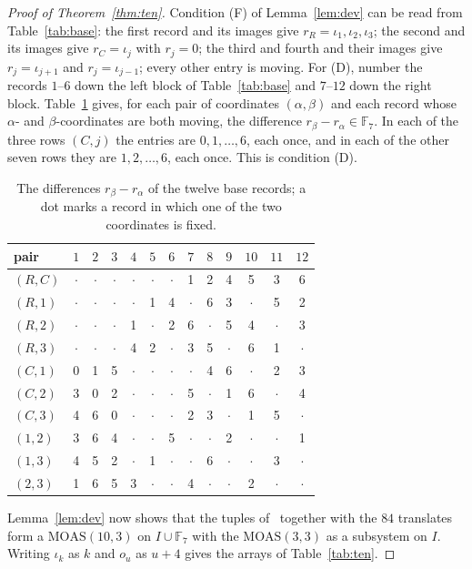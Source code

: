 \documentclass[11pt]{amsart}
\theoremstyle{definition}\newtheorem{definition}[theorem]{Definition}
\theoremstyle{remark}\newtheorem{remark}[theorem]{Remark}
\newcommand{\MOAS}{\mathrm{MOAS}}
\begin{document}
\begin{proof}[Proof of Theorem~\ref{thm:ten}]
Condition (F) of Lemma~\ref{lem:dev} can be read from Table~\ref{tab:base}: the first record and its images give
$r_R=\iota_1,\iota_2,\iota_3$; the second and its images give $r_C=\iota_j$ with $r_j=0$; the third and fourth and
their images give $r_j=\iota_{j+1}$ and $r_j=\iota_{j-1}$; every other entry is moving. For (D), number the records
$1$--$6$ down the left block of Table~\ref{tab:base} and $7$--$12$ down the right block. Table~\ref{tab:diff} gives, for
each pair of coordinates $(\alpha,\beta)$ and each record whose $\alpha$- and $\beta$-coordinates are both moving, the
difference $r_\beta-r_\alpha\in\mathbb F_7$. In each of the three rows $(C,j)$ the entries are $0,1,\dots,6$, each once,
and in each of the other seven rows they are $1,2,\dots,6$, each once. This is condition (D).

\begin{table}[ht]
\centering\small
\begin{tabular}{lcccccccccccc}
\toprule
pair & $1$ & $2$ & $3$ & $4$ & $5$ & $6$ & $7$ & $8$ & $9$ & $10$ & $11$ & $12$\\
\midrule
$(R,C)$ & $\cdot$ & $\cdot$ & $\cdot$ & $\cdot$ & $\cdot$ & $\cdot$ & 1 & 2 & 4 & 5 & 3 & 6 \\
$(R,1)$ & $\cdot$ & $\cdot$ & $\cdot$ & $\cdot$ & 1 & 4 & $\cdot$ & 6 & 3 & $\cdot$ & 5 & 2 \\
$(R,2)$ & $\cdot$ & $\cdot$ & $\cdot$ & 1 & $\cdot$ & 2 & 6 & $\cdot$ & 5 & 4 & $\cdot$ & 3 \\
$(R,3)$ & $\cdot$ & $\cdot$ & $\cdot$ & 4 & 2 & $\cdot$ & 3 & 5 & $\cdot$ & 6 & 1 & $\cdot$ \\
$(C,1)$ & 0 & 1 & 5 & $\cdot$ & $\cdot$ & $\cdot$ & $\cdot$ & 4 & 6 & $\cdot$ & 2 & 3 \\
$(C,2)$ & 3 & 0 & 2 & $\cdot$ & $\cdot$ & $\cdot$ & 5 & $\cdot$ & 1 & 6 & $\cdot$ & 4 \\
$(C,3)$ & 4 & 6 & 0 & $\cdot$ & $\cdot$ & $\cdot$ & 2 & 3 & $\cdot$ & 1 & 5 & $\cdot$ \\
$(1,2)$ & 3 & 6 & 4 & $\cdot$ & $\cdot$ & 5 & $\cdot$ & $\cdot$ & 2 & $\cdot$ & $\cdot$ & 1 \\
$(1,3)$ & 4 & 5 & 2 & $\cdot$ & 1 & $\cdot$ & $\cdot$ & 6 & $\cdot$ & $\cdot$ & 3 & $\cdot$ \\
$(2,3)$ & 1 & 6 & 5 & 3 & $\cdot$ & $\cdot$ & 4 & $\cdot$ & $\cdot$ & 2 & $\cdot$ & $\cdot$ \\
\bottomrule
\end{tabular}
\caption{The differences $r_\beta-r_\alpha$ of the twelve base records; a dot marks a record in which one of the two
coordinates is fixed.}\label{tab:diff}
\end{table}

Lemma~\ref{lem:dev}
now shows that the tuples of~\cite[Example~2.18]{ABW} together with the $84$ translates form a $\MOAS(10,3)$ on
$I\cup\mathbb F_7$ with the $\MOAS(3,3)$ as a subsystem on $I$. Writing $\iota_k$ as $k$ and $o_u$ as $u+4$ gives the
arrays of Table~\ref{tab:ten}.
\end{proof}
\end{document}
